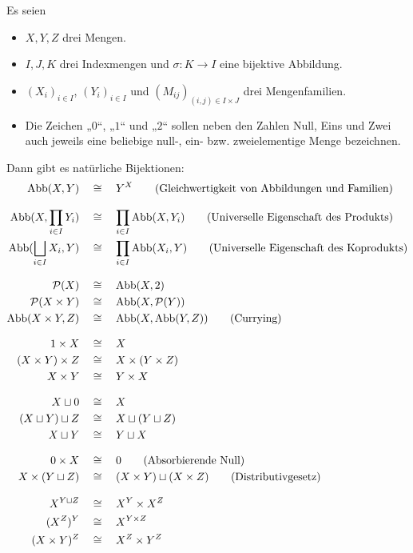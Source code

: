 Es seien
\begin{itemize}
    \item $X,Y,Z$ drei Mengen.
    \item $I,J,K$ drei Indexmengen und $\sigma : K\to I$ eine bijektive Abbildung.
    \item $(X_i)_{i\in I}$, $(Y_i)_{i\in I}$ und $(M_{ij})_{(i,j)\in I\times J}$ drei Mengenfamilien.
    \item Die Zeichen „$0$“, „$1$“ und „$2$“ sollen neben den Zahlen Null, Eins und Zwei auch jeweils eine beliebige null-, ein- bzw. zweielementige Menge bezeichnen.
\end{itemize}
Dann gibt es natürliche Bijektionen:
\begingroup
\allowdisplaybreaks
\begin{align*}
    \Abb(X,Y) & \quad\cong\quad Y^X \tag{Gleichwertigkeit von Abbildungen und Familien} \\[0.8em]
    \Abb(X,\prod_{i\in I} Y_i) & \quad\cong\quad \prod_{i\in I} \Abb(X,Y_i) \tag{Universelle Eigenschaft des Produkts} \\
    \Abb(\bigsqcup_{i\in I} X_i,Y) & \quad\cong\quad \prod_{i\in I} \Abb(X_i,Y) \tag{Universelle Eigenschaft des Koprodukts} \\[0.8em]
    \calP(X) & \quad\cong\quad \Abb(X,2) \\
    \calP(X\times Y) & \quad\cong\quad \Abb(X,\calP(Y)) \\
    \Abb(X\times Y,Z) & \quad\cong\quad \Abb(X,\Abb(Y,Z)) \tag{Currying} \\[0.8em]
    1 \times X & \quad\cong\quad X \\
    (X\times Y)\times Z & \quad\cong\quad X\times (Y\times Z) \\
    X\times Y & \quad\cong\quad Y\times X \\[0.8em]
    X\sqcup 0 & \quad\cong\quad X \\
    (X\sqcup Y)\sqcup Z & \quad\cong\quad X\sqcup (Y\sqcup Z) \\
    X \sqcup Y & \quad\cong\quad Y\sqcup X
    \\[0.8em]
    0 \times X & \quad\cong\quad 0 \tag{Absorbierende Null} \\
    X \times (Y\sqcup Z) & \quad\cong\quad (X\times Y)\sqcup (X\times Z) \tag{Distributivgesetz} \\[0.8em]
    X^{Y\sqcup Z} & \quad\cong\quad X^Y \times X^Z \\
    (X^Z)^Y & \quad\cong\quad X^{Y\times Z} \\
    (X\times Y)^Z & \quad\cong\quad X^Z \times Y^Z \\

\end{align*}
